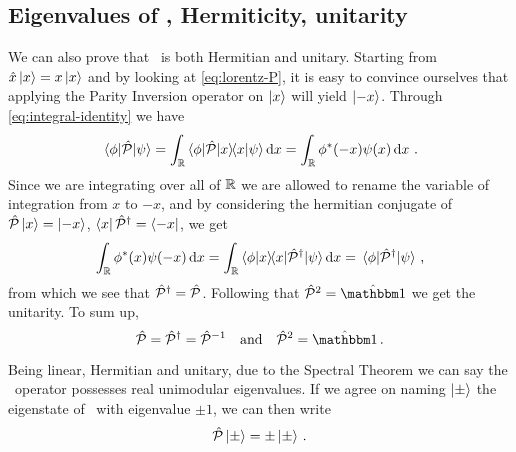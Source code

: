         \subsection{Eigenvalues of \hP, Hermiticity, unitarity}
            We can also prove that \hP\ is both Hermitian and unitary. Starting from $\hat{x}\ket{x} = x\ket{x}$ and by looking at \eqref{eq:lorentz-P}, it is easy to convince ourselves that applying the Parity Inversion operator on $\ket{x}$ will yield $\ket{-x}$. Through \eqref{eq:integral-identity} we have
            \begin{equation*}
                \mel{\phi}{\hP}{\psi}
                = \int\nolimits_{\bbR}\bra{\phi}\!\hP\!\ket{x}\!\!\bra{x}\ket{\psi}\dd{x}
                = \int\nolimits_{\bbR}\phi^*\pqty{-x}\psi\pqty{x}\dd{x}
                \myperiod
            \end{equation*}
            Since we are integrating over all of $\mathbb{R}$ we are allowed to rename the variable of integration from $x$ to $-x$, and by considering the hermitian conjugate of $\mathcal{\hat{P}}\ket{x} = \ket{-x}$, $\bra{x}\mathcal{\hat{P}}^\dag = \bra{-x}$, we get
            \begin{equation*}
                \int\nolimits_{\bbR}\phi^*\pqty{x}\psi\pqty{-x}\dd{x}
                = \int\nolimits_{\bbR}\bra{\phi}\ket{x}\!\!\bra{x}\!\hP^\dag\!\ket{\psi}\dd{x}
                = \mel{\phi}{\hP^\dag}{\psi}
                \mycomma
            \end{equation*}
            from which we see that $\mathcal{\hat{P}}^\dag = \mathcal{\hat{P}}$. Following that $\hP^2 = \togglehat{\idM}$ we get the unitarity. To sum up,
            \begin{equation}
                \label{eq:P-properties}
                \hP
                = \hP^\dag
                = \hP^{-1}
                \qand
                \hP^2
                = \togglehat{\idM}
                \myperiod
            \end{equation}

            Being linear, Hermitian and unitary, due to the Spectral Theorem we can say the \hP\ operator possesses real unimodular eigenvalues. If we agree on naming $\ket{\pm}$ the eigenstate of \hP\ with eigenvalue $\pm 1$, we can then write
            \begin{equation}
                \label{eq:eigenvalue-problem-P}
                \mathcal{\hat{P}}\ket{\pm}
                = \pm\ket{\pm}\,\text{.}
            \end{equation}
        
